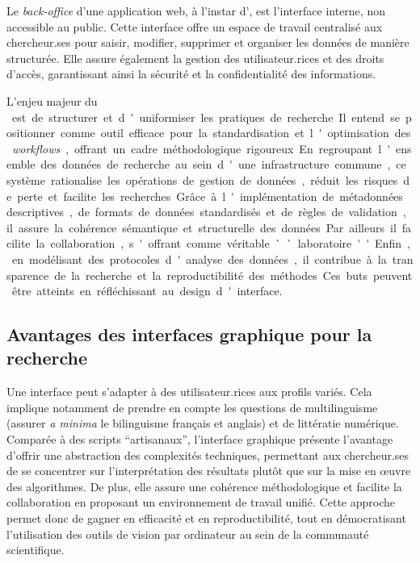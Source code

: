 Le \textit{back-office} d'une application web, à l'instar d'\aikon, est l'interface interne, non accessible
au public. Cette interface offre un espace de travail centralisé aux
chercheur.ses pour saisir, modifier, supprimer et organiser les données de
manière structurée. Elle assure également la gestion des utilisateur.rices et
des droits d'accès, garantissant ainsi la sécurité et la confidentialité
des informations.

L'enjeu majeur du \si \aikon est de structurer et d'uniformiser les
pratiques de recherche. Il entend se positionner comme outil efficace
pour la standardisation et l'optimisation des \textit{workflows}, offrant un
cadre méthodologique rigoureux. En regroupant l'ensemble des données de
recherche au sein d'une infrastructure commune, ce système rationalise
les opérations de gestion de données, réduit les risques de perte et facilite les recherches. Grâce à l'implémentation de
métadonnées descriptives, de formats de données standardisés et de
règles de validation, il assure la cohérence sémantique et structurelle
des données. Par ailleurs il facilite la collaboration, s'offrant comme
véritable ``laboratoire''. Enfin, en modélisant des protocoles d'analyse
des données, il contribue à la transparence de la recherche et la
reproductibilité des méthodes.

Ces buts peuvent être atteints en réfléchissant au design d'interface.

\hypertarget{avantages-des-interfaces-graphique-pour-la-recherche}{%
\subsection{Avantages des interfaces graphique pour la
recherche}\label{avantages-des-interfaces-graphique-pour-la-recherche}}

Une interface peut s'adapter à des utilisateur.rices aux profils variés.
Cela implique notamment de prendre en compte les questions de
multilinguisme (assurer \emph{a minima} le bilinguisme français et
anglais) et de littératie numérique. Comparée à des scripts
``artisanaux'', l'interface graphique présente l'avantage d'offrir une
abstraction des complexités techniques, permettant aux chercheur.ses de se
concentrer sur l'interprétation des résultats plutôt que sur la mise en
œuvre des algorithmes. De plus, elle assure une cohérence
méthodologique et facilite la collaboration en proposant un
environnement de travail unifié. Cette approche permet donc de gagner en
efficacité et en reproductibilité, tout en démocratisant l'utilisation
des outils de vision par ordinateur au sein de la communauté
scientifique.

